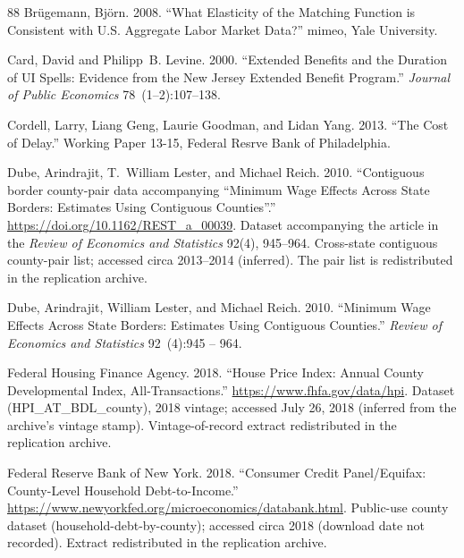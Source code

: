 \documentclass[12pt]{article}
\newcommand{\1}{\mathbf{1}}
\begin{document}
\begin{thebibliography}{88}
Br{\"u}gemann, Bj{\"o}rn. 2008.
\newblock \enquote{What Elasticity of the Matching Function is Consistent with U.S. Aggregate Labor Market Data?}
\newblock mimeo, Yale University.

Card, David and Philipp~B. Levine. 2000.
\newblock \enquote{Extended Benefits and the Duration of UI Spells: Evidence from the New Jersey Extended Benefit Program.}
\newblock \emph{Journal of Public Economics} 78~(1--2):107--138.

Cordell, Larry, Liang Geng, Laurie Goodman, and Lidan Yang. 2013.
\newblock \enquote{The Cost of Delay.}
\newblock Working Paper 13-15, Federal Resrve Bank of Philadelphia.

Dube, Arindrajit, T.~William Lester, and Michael Reich. 2010{}.
\newblock \enquote{Contiguous border county-pair data accompanying ``Minimum Wage Effects Across State Borders: Estimates Using Contiguous Counties''.}
\newblock \urlprefix\url{https://doi.org/10.1162/REST_a_00039}.
\newblock Dataset accompanying the article in the \emph{Review of Economics and Statistics} 92(4), 945--964. Cross-state contiguous county-pair list; accessed circa 2013--2014 (inferred). The pair list is redistributed in the replication archive.

Dube, Arindrajit, William Lester, and Michael Reich. 2010{}.
\newblock \enquote{Minimum Wage Effects Across State Borders: Estimates Using Contiguous Counties.}
\newblock \emph{Review of Economics and Statistics} 92~(4):945 -- 964.

{Federal Housing Finance Agency}. 2018.
\newblock \enquote{House Price Index: Annual County Developmental Index, All-Transactions.}
\newblock \urlprefix\url{https://www.fhfa.gov/data/hpi}.
\newblock Dataset ({HPI}\_{AT}\_{BDL}\_county), 2018 vintage; accessed July 26, 2018 (inferred from the archive's vintage stamp). Vintage-of-record extract redistributed in the replication archive.

{Federal Reserve Bank of New York}. 2018.
\newblock \enquote{Consumer Credit Panel/{E}quifax: County-Level Household Debt-to-Income.}
\newblock \urlprefix\url{https://www.newyorkfed.org/microeconomics/databank.html}.
\newblock Public-use county dataset (household-debt-by-county); accessed circa 2018 (download date not recorded). Extract redistributed in the replication archive.


\end{thebibliography}
\end{document}
